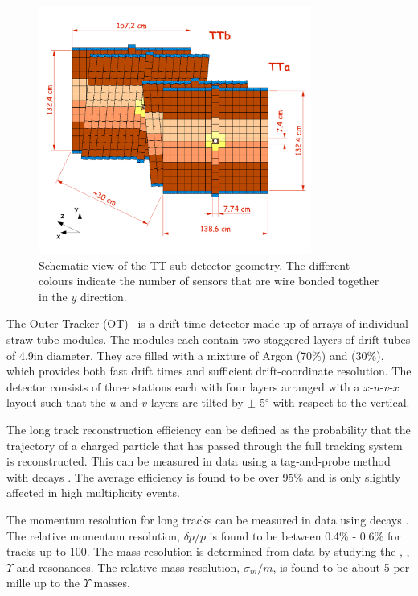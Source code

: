 \begin{figure}[!htb]
\centering
\includegraphics[width=0.8\textwidth]{figs/detector/tt.pdf}
\caption{Schematic view of the TT sub-detector geometry. The different colours indicate the number of sensors that are wire bonded together in the $y$ direction.}
\label{fig:tt}
\end{figure}

The Outer Tracker (OT)~\cite{ot-tdr,ot-perf} is a drift-time detector made up of arrays of individual straw-tube modules. The modules each contain two staggered layers of drift-tubes of 4.9\mm in diameter. They are filled with a mixture of Argon (70\%) and \cotwo (30\%), which provides both fast drift times and sufficient drift-coordinate resolution. The detector consists of three stations each with four layers arranged with a \mbox{$x$-$u$-$v$-$x$} layout such that the $u$ and $v$ layers are tilted by $\pm$ 5$^{\circ}$ with respect to the vertical.

The long track reconstruction efficiency can be defined as the probability that the trajectory of a charged particle that has passed through the full tracking system is reconstructed. This can be measured in data using a tag-and-probe method with \decay{\jpsi}{\mumu} decays \cite{tracking-perf}. The average efficiency is found to be over 95\% and is only slightly affected in high multiplicity events.

The momentum resolution for long tracks can be measured in data using \decay{\jpsi}{\mumu} decays \cite{lhcb-perf}. The relative momentum resolution, $\delta p/p$ is found to be between 0.4\% - 0.6\% for tracks up to 100\gevc. The mass resolution is determined from data by studying the \jpsi, \psitwos, $\Upsilon$ and \Z resonances. The relative mass resolution, $\sigma_{m}/m$, is found to be about 5 per mille up to the $\Upsilon$ masses.


